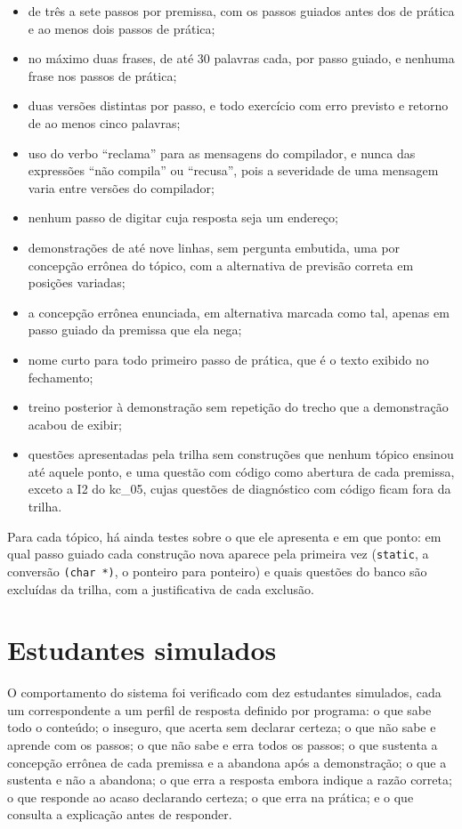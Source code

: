 \begin{itemize}
\item de três a sete passos por premissa, com os passos guiados antes dos de prática e ao menos dois passos de prática;
\item no máximo duas frases, de até 30 palavras cada, por passo guiado, e nenhuma frase nos passos de prática;
\item duas versões distintas por passo, e todo exercício com erro previsto e retorno de ao menos cinco palavras;
\item uso do verbo ``reclama'' para as mensagens do compilador, e nunca das expressões ``não compila'' ou ``recusa'', pois a severidade de uma mensagem varia entre versões do compilador;
\item nenhum passo de digitar cuja resposta seja um endereço;
\item demonstrações de até nove linhas, sem pergunta embutida, uma por concepção errônea do tópico, com a alternativa de previsão correta em posições variadas;
\item a concepção errônea enunciada, em alternativa marcada como tal, apenas em passo guiado da premissa que ela nega;
\item nome curto para todo primeiro passo de prática, que é o texto exibido no fechamento;
\item treino posterior à demonstração sem repetição do trecho que a demonstração acabou de exibir;
\item questões apresentadas pela trilha sem construções que nenhum tópico ensinou até aquele ponto, e uma questão com código como abertura de cada premissa, exceto a I2 do kc\_05, cujas questões de diagnóstico com código ficam fora da trilha.
\end{itemize}

Para cada tópico, há ainda testes sobre o que ele apresenta e em que ponto: em qual passo guiado cada construção nova aparece pela primeira vez (\texttt{static}, a conversão \texttt{(char *)}, o ponteiro para ponteiro) e quais questões do banco são excluídas da trilha, com a justificativa de cada exclusão.

\section{Estudantes simulados}

O comportamento do sistema foi verificado com dez estudantes simulados, cada um correspondente a um perfil de resposta definido por programa: o que sabe todo o conteúdo; o inseguro, que acerta sem declarar certeza; o que não sabe e aprende com os passos; o que não sabe e erra todos os passos; o que sustenta a concepção errônea de cada premissa e a abandona após a demonstração; o que a sustenta e não a abandona; o que erra a resposta embora indique a razão correta; o que responde ao acaso declarando certeza; o que erra na prática; e o que consulta a explicação antes de responder.

